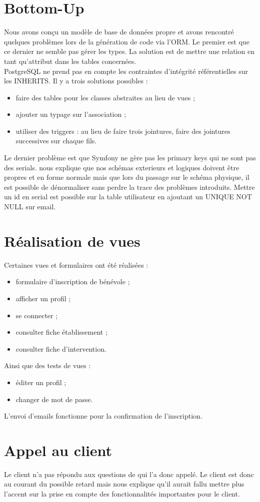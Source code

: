 \documentclass [a4paper] {article}
\begin{document}
\section{Bottom-Up}
Nous avons conçu un modèle de base de données propre et avons rencontré quelques problèmes lors de la génération de code via l'ORM. Le premier est que ce dernier ne semble pas gérer les types. La solution est de mettre une relation en tant qu'attribut dans les tables concernées. \\
PostgreSQL ne prend pas en compte les contraintes d'intégrité référentielles sur les INHERITS. Il y a trois solutions possibles :
\begin{itemize}
\item faire des tables pour les classes abstraites au lieu de vues ;
\item ajouter un typage sur l'association ;
\item utiliser des triggers : au lieu de faire trois jointures, faire des jointures successives sur chaque fils.
\end{itemize}

Le dernier problème est que Symfony ne gère pas les primary keys qui ne sont pas des serials. \nomTuteurPedago{} nous explique que nos schémas exterieurs et logiques doivent être propres et en forme normale mais que lors du passage sur le schéma physique, il est possible de dénormaliser sans perdre la trace des problèmes introduits. Mettre un id en serial est possible sur la table utilisateur en ajoutant un UNIQUE NOT NULL sur email.

\section{Réalisation de vues}
Certaines vues et formulaires ont été réalisées :
\begin{itemize}
\item formulaire d'inscription de bénévole ;
\item afficher un profil ;
\item se connecter ;
\item consulter fiche établissement ;
\item consulter fiche d'intervention.
\end{itemize}
Ainsi que des tests de vues : 
\begin{itemize}
\item éditer un profil ;
\item changer de mot de passe.
\end{itemize}

L'envoi d'emails fonctionne pour la confirmation de l'inscription.

\section{Appel au client}
Le client n'a pas répondu aux questions de \Sergi{} qui l'a donc appelé. Le client est donc au courant du possible retard mais \nomTuteurPedago{} nous explique qu'il aurait fallu mettre plus l'accent sur la prise en compte des fonctionnalités importantes pour le client.


\newpage
\end{document}
